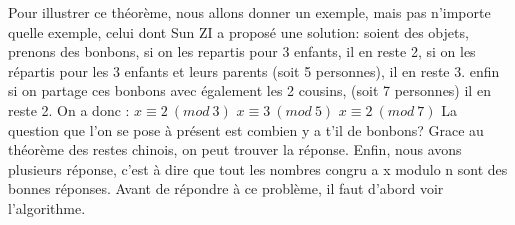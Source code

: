 \documentclass[a4paper, 11pt]{article}
\begin{document}
\newline
\newline
\newline
Pour illustrer ce théorème, nous allons donner un exemple, mais pas n'importe quelle exemple, celui dont Sun ZI a proposé une solution:
\newline
soient des objets, prenons des bonbons, si on les repartis pour 3 enfants, il en reste 2, si on les répartis
pour les 3 enfants et leurs parents (soit 5 personnes), il en reste 3. enfin si on partage ces bonbons avec également les 2 cousins,
(soit 7 personnes) il en reste 2. On a donc :
\newline 
$ x\equiv 2 \: (mod \:  3)$ 
\newline
$ x\equiv 3 \: (mod \: 5)$
\newline
$ x\equiv 2 \:(mod\: 7)$
\newline
La question que l'on se pose à présent est combien y a t'il de bonbons?
\newline
Grace au théorème des restes chinois, on peut trouver la réponse. Enfin, nous avons plusieurs réponse, c'est à dire que tout les nombres congru a x modulo n sont des bonnes réponses.
Avant de répondre à ce problème, il faut d'abord voir l'algorithme.

\newpage
\end{document}
